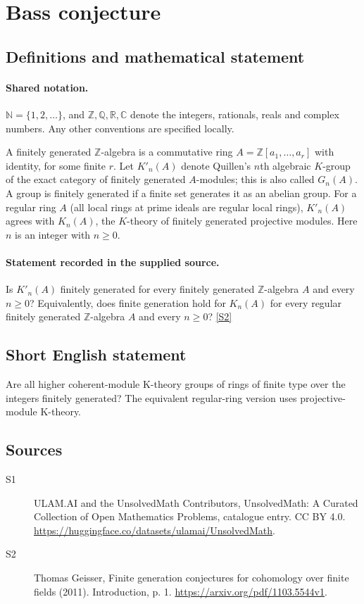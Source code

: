 \documentclass[11pt]{article}
\newcommand{\sref}[2]{\hyperlink{source:#1:#2}{[S#2]}}
\begin{document}
\section{Bass conjecture}\label{statement}

\subsection{Definitions and mathematical statement}

\paragraph{Shared notation.}$\mathbb N=\{1,2,\ldots\}$, and $\mathbb Z,\mathbb Q,\mathbb R,\mathbb C$ denote the integers, rationals, reals and complex numbers. Any other conventions are specified locally.


A finitely generated $\mathbb Z$-algebra is a commutative ring $A=\mathbb Z[a_1,\ldots,a_r]$ with identity, for some finite $r$. Let $K'_n(A)$ denote Quillen's $n$th algebraic $K$-group of the exact category of finitely generated $A$-modules; this is also called $G_n(A)$. A group is finitely generated if a finite set generates it as an abelian group. For a regular ring $A$ (all local rings at prime ideals are regular local rings), $K'_n(A)$ agrees with $K_n(A)$, the $K$-theory of finitely generated projective modules. Here $n$ is an integer with $n\geq0$.
\paragraph{Statement recorded in the supplied source.}
Is $K'_n(A)$ finitely generated for every finitely generated $\mathbb Z$-algebra $A$ and every $n\geq0$? Equivalently, does finite generation hold for $K_n(A)$ for every regular finitely generated $\mathbb Z$-algebra $A$ and every $n\geq0$? \sref{statement}{2}
\subsection{Short English statement}
Are all higher coherent-module K-theory groups of rings of finite type over the integers finitely generated? The equivalent regular-ring version uses projective-module K-theory.
\subsection{Sources}
\begin{description}
\item[\hypertarget{source:statement:1}{S1}] ULAM.AI and the UnsolvedMath Contributors, UnsolvedMath: A Curated Collection of Open Mathematics Problems, catalogue entry. CC BY 4.0. \url{https://huggingface.co/datasets/ulamai/UnsolvedMath}.
\item[\hypertarget{source:statement:2}{S2}] Thomas Geisser, Finite generation conjectures for cohomology over finite fields (2011). Introduction, p. 1. \url{https://arxiv.org/pdf/1103.5544v1}.
\end{description}
\label{end:statement}
\end{document}
